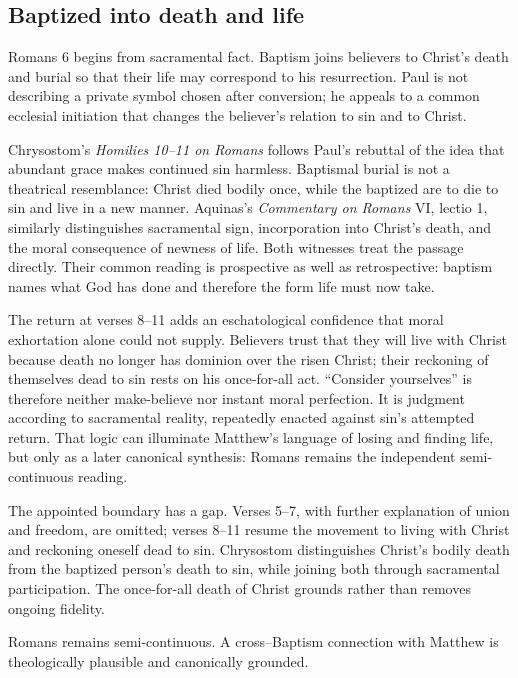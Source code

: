 \subsection*{Baptized into death and life\enspace{}}

Romans 6 begins from sacramental fact. Baptism joins believers to Christ's death and burial so that their life may correspond to his resurrection. Paul is not describing a private symbol chosen after conversion; he appeals to a common ecclesial initiation that changes the believer's relation to sin and to Christ.

Chrysostom's \emph{Homilies 10--11 on Romans} follows Paul's rebuttal of the idea that abundant grace makes continued sin harmless. Baptismal burial is not a theatrical resemblance: Christ died bodily once, while the baptized are to die to sin and live in a new manner. Aquinas's \emph{Commentary on Romans} VI, lectio 1, similarly distinguishes sacramental sign, incorporation into Christ's death, and the moral consequence of newness of life. Both witnesses treat the passage directly. Their common reading is prospective as well as retrospective: baptism names what God has done and therefore the form life must now take.

The return at verses 8--11 adds an eschatological confidence that moral exhortation alone could not supply. Believers trust that they will live with Christ because death no longer has dominion over the risen Christ; their reckoning of themselves dead to sin rests on his once-for-all act. “Consider yourselves” is therefore neither make-believe nor instant moral perfection. It is judgment according to sacramental reality, repeatedly enacted against sin's attempted return. That logic can illuminate Matthew's language of losing and finding life, but only as a later canonical synthesis: Romans remains the independent semi-continuous reading.

The appointed boundary has a gap. Verses 5--7, with further explanation of union and freedom, are omitted; verses 8--11 resume the movement to living with Christ and reckoning oneself dead to sin. Chrysostom distinguishes Christ's bodily death from the baptized person's death to sin, while joining both through sacramental participation. The once-for-all death of Christ grounds rather than removes ongoing fidelity.

Romans remains semi-continuous. A cross--Baptism connection with Matthew is theologically plausible and canonically grounded.

